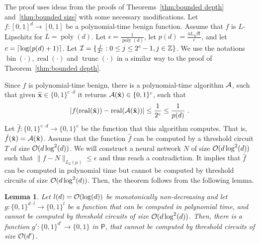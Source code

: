 \documentclass[11pt]{article}
\newtheorem{lemma}{Lemma}[section]
\DeclarePairedDelimiter\ceil{\lceil}{\rceil}
\newcommand{\bx}{\mathbf{x}}
\newcommand{\co}{{\cal O}}
\newcommand{\ca}{{\cal A}}
\newcommand{\ci}{{\cal I}}
\newcommand{\integers}{{\mathbb Z}}
\DeclareMathOperator{\poly}{poly}
\DeclareMathOperator{\bin}{bin}
\DeclareMathOperator{\real}{real}
\DeclareMathOperator{\trunc}{trunc}
\newcommand{\snorm}[1]{\|#1\|} %
\newcommand{\hbx}{{\hat{\bx}}}
\newcommand{\Ptime}{\textsf{P}}
\begin{document}
The proof uses ideas from the proofs of Theorems~\ref{thm:bounded depth} and~\ref{thm:bounded size} with some necessary modifications.
Let $f:[0,1]^d \rightarrow [0,1]$ be a polynomial-time benign function. Assume that $f$ is $L$-Lipschitz for $L=\poly(d)$. Let $\epsilon=\frac{1}{\poly(d)}$, let 
$p(d)=\frac{4L\sqrt{d}}{\epsilon}$, 
and let $c=\ceil{\log(p(d)+1)}$. Let $\ci = \{\frac{j}{2^c}: 0 \leq j \leq  2^c - 1, j \in \integers\}$. 
We use the notations $\bin(\cdot),\real(\cdot)$ and $\trunc(\cdot)$ in a similar way to the proof of Theorem~\ref{thm:bounded depth}.

Since $f$ is polynomial-time benign, there is a polynomial-time algorithm $\ca$, such that given $\hbx \in \{0,1\}^{c \cdot d}$ it returns $\ca(\hbx) \in \{0,1\}^c$, such that 
\begin{equation*}
	\label{eq:def hatf - size2}
	|f(\real(\hbx))-\real(\ca(\hbx))| \leq \frac{1}{2^c} \leq \frac{1}{p(d)}~.
\end{equation*}
Let $\hat{f}:\{0,1\}^{c \cdot d} \rightarrow \{0,1\}^c$ be the function that this algorithm computes. That is, $\hat{f}(\hbx)=\ca(\hbx)$.
Assume that the function $\hat{f}$ can be computed by a threshold circuit $T$ of size $\co(d\log^2(d))$. We will construct a neural network $N$ of size $\co(d\log^2(d))$ such that $\snorm{f-N}_{L_2(\mu)} \leq \epsilon$ and thus reach a contradiction. It implies that $\hat{f}$ can be computed in polynomial time but cannot be computed by  threshold circuits of size 
$\co(d\log^2(d))$.
Then, the theorem follows from the following lemma.
\begin{lemma}
	\label{lemma:to output dim 1 size m}
	Let $l(d) = \co(\log(d))$ be monotonically non-decreasing and let $g:\{0,1\}^{d \cdot l} \rightarrow \{0,1\}^l$ be a function that can be computed in polynomial time, and cannot be computed by threshold circuits of size $\co(d\log^2(d))$. Then, there is a function $g':\{0,1\}^{d'} \rightarrow \{0,1\}$ in $\Ptime$, that cannot be computed by threshold circuits of size $\co(d')$.
\end{lemma}
\end{document}
